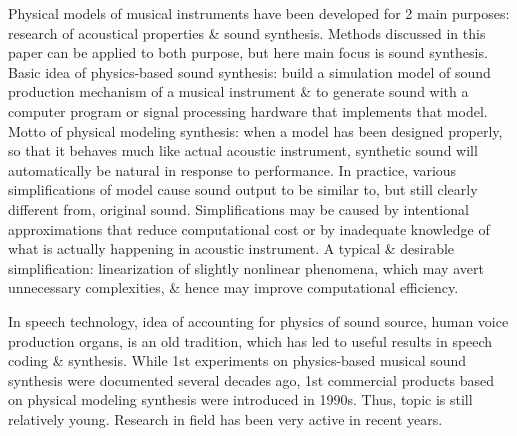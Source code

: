 \documentclass{article}
\begin{document}
\begin{itemize}
	Physical models of musical instruments have been developed for 2 main purposes: research of acoustical properties \& sound synthesis. Methods discussed in this paper can be applied to both purpose, but here main focus is sound synthesis. Basic idea of physics-based sound synthesis: build a simulation model of sound production mechanism of a musical instrument \& to generate sound with a computer program or signal processing hardware that implements that model. Motto of physical modeling synthesis: when a model has been designed properly, so that it behaves much like actual acoustic instrument, synthetic sound will automatically be natural in response to performance. In practice, various simplifications of model cause sound output to be similar to, but still clearly different from, original sound. Simplifications may be caused by intentional approximations that reduce computational cost or by inadequate knowledge of what is actually happening in acoustic instrument. A typical \& desirable simplification: linearization of slightly nonlinear phenomena, which may avert unnecessary complexities, \& hence may improve computational efficiency.
	
	In speech technology, idea of accounting for physics of sound source, human voice production organs, is an old tradition, which has led to useful results in speech coding \& synthesis. While 1st experiments on physics-based musical sound synthesis were documented several decades ago, 1st commercial products based on physical modeling synthesis were introduced in 1990s. Thus, topic is still relatively young. Research in field has been very active in recent years.
	

\end{itemize}
\end{document}
